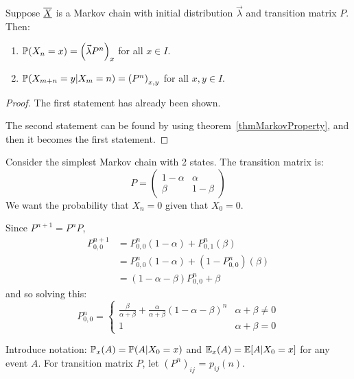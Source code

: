 \documentclass[../Main.tex]{subfiles}
\begin{document}
\begin{theorem}
    Suppose $\chain{X}$ is a Markov chain with initial distribution $\vec{\lambda}$ and transition matrix $P$. Then:
    \begin{enumerate}
        \item $\P(X_n = x) = \left(\vec{\lambda} P^n\right)_x$ for all $x \in I$.
        \item $\P(X_{m + n} = y | X_m = n) = \left(P^n\right)_{x, y}$ for all $x, y \in I$.
    \end{enumerate}
    \label{thmMarkovMatPower}
\end{theorem}
\begin{proof}
    The first statement has already been shown.

    The second statement can be found by using theorem~\ref{thmMarkovProperty}, and then it becomes the first statement.
\end{proof}
\begin{example}
    Consider the simplest Markov chain with 2 states.
    The transition matrix is:
    \begin{equation*}
        P = 
        \begin{pmatrix}
            1 - \alpha & \alpha \\
            \beta & 1 - \beta
        \end{pmatrix}
    \end{equation*}
    We want the probability that $X_n = 0$ given that $X_0 = 0$.

    Since $P^{n+1} = P^n P$, 
    \begin{align*}
        P_{0, 0}^{n+1} &= P_{0, 0}^n (1 - \alpha) + P_{0, 1}^n (\beta) \\
        &= P_{0, 0}^n (1 - \alpha) + (1 - P_{0, 0}^n) (\beta) \\
        &= (1 - \alpha - \beta) P_{0, 0}^n + \beta
    \end{align*}
    and so solving this:
    \begin{equation*}
        P_{0, 0}^n =
        \begin{cases}
            \frac{\beta}{\alpha + \beta} + \frac{\alpha}{\alpha + \beta} (1 - \alpha - \beta)^n & \alpha + \beta \neq 0 \\
            1 & \alpha + \beta = 0
        \end{cases}
    \end{equation*}
\end{example}
Introduce notation:
$\P_x(A) = \P(A | X_0 = x)$ and $\E_x(A) = \E[A | X_0 = x]$ for any event $A$. For transition matrix $P$, let $(P^n)_{ij}$ = $p_{ij}(n)$.
\end{document}
